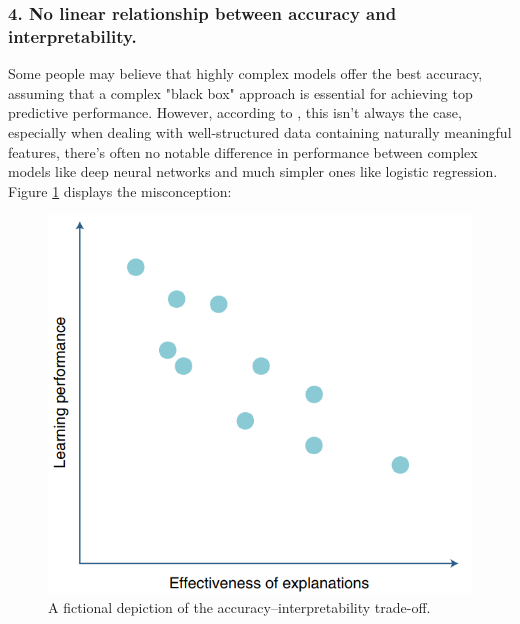 \subsubsection*{4. No linear relationship between accuracy and interpretability.}
Some people may believe that highly complex models offer the best accuracy, assuming that a complex "black box" approach is essential for achieving top predictive performance. However, according to \cite{rudin2019stop}, this isn't always the case, especially when dealing with well-structured data containing naturally meaningful features, there's often no notable difference in performance between complex models like deep neural networks and much simpler ones like logistic regression. Figure \ref{fig:tradeoff} displays the misconception:

\begin{figure}[H]
    \centering
    \includegraphics[width=0.5\linewidth]{pics/fictional_depiction.png}
    \caption[A fictional depiction of the accuracy–interpretability trade-off.]{A fictional depiction of the accuracy–interpretability trade-off.\cite{rudin2019stop}}
    \label{fig:tradeoff}
\end{figure}
